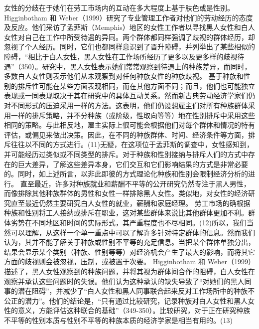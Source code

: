 \documentclass[UTF8]{ctexart}
\begin{document}
女性的分歧在于她们在劳工市场内的互动在多大程度上基于肤色或是性别。Higginbotham 和 Weber（1999）研究了专业管理工作者对他们的劳动经历的态度及反应。他们采访了孟菲斯（Memphis）地区的女性工作者以寻找黑人女性和白人女性对自己在工作中所受待遇的异同。两个群体都同样强调了歧视的群体经历，却忽视了个人经历。同时，它们也都同样意识到了晋升障碍，并列举出了某些相似的障碍，“相比于白人女性，黑人女性在工作场所经历了更多以及更多样的歧视待遇”（350）。研究中，黑人女性表示她们常常观察到待遇上的种族差异，而同时，多数白人女性则表示他们从未观察到对任何种族女性的种族歧视。
基于种族和性别的排斥性可能在某些方面表现相同，而在其他方面不同；而且，他们也可能独立表现或一同表现取决于其在研究中的具体互动关系。然而新古典劳动经济学家们仍对不同形式的压迫采用一样的方法。这表明，他们仍设想雇主们对所有种族群体采用一样的排斥策略，并不分种族（或阶级，性取向等等）地在性别排斥中采用这些相同的策略。与此相反地，雇主实际上很可能会根据他们对每个群体和情况的特有评估，或偏见来做出决策。因此，在不同的种族群体、时间、经济条件等方面，排斥往往以不同的方式进行。(11)无疑，在这项位于孟菲斯的调查中，女性感知到，并可能经历过类似或不同类型的排斥。对于种族和性别接纳与排斥人们的方式中存在的巨大差异，了解这些差异本身，它们交互和它们影响结果的方式是非常必要的。同时，如上述所言，以非此即彼的方式理论化种族和性别会限制经济分析的进行。
直至最近，许多对种族就业和薪酬不平等的公开研究仍然专注于黑人男性，而像排除其他种族群体的男性和女性一样排除黑人女性。类似地，对女性的经济研究直至最近仍然主要研究白人女性的就业，薪酬和家庭经理。
劳工市场的确根据种族和性别将工人接纳或排斥在职业，这对某些群体来说比其他群体更加不利。群体劣势在不同地区和时间的实际形式，其严重程度也不尽相同。(12)所以，我们当然可以理解，从这样一个单一重点中可以了解许多针对特定群体的信息。然而我们认为，其并不能了解关于种族或性别不平等的充足信息。当把某个群体单独分出，结果会显示某个类别（种族、性别等等）对经济机会产生了最大的影响，而将其它方面的歧视则会被忽视，压制，或被置于次要。
Higginbotham 和 Weber（1999）描述了，黑人女性观察到的种族问题，并将其视为群体间合作的阻碍，白人女性在观察并承认这些问题时的失误。他们认为这种承认的缺失导致了“对她们的黑人同事的潜在阻碍”，并减少了“白人女性和黑人同事联合起来反对工作场所中的种族不公正的潜力”。他们的结论是，“只有通过比较研究，记录种族对白人女性和黑人女性的意义，方能评估这种联合的基础”（349-350）。比较研究，对于正在研究种族不平等的性别本质与性别不平等的种族本质的经济学家是相当有用的。(13)
\end{document}

